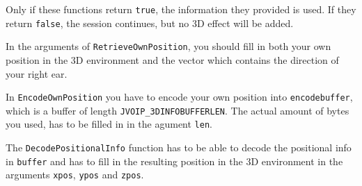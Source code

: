 		Only if these functions return {\tt true}, the information they provided
		is used. If they return {\tt false}, the session continues, but 
		no 3D effect will be added.
		
		In the arguments of {\tt Retrieve\-Own\-Position}, you should fill in both
		your own position in the 3D environment and the vector which contains
		the direction of your right ear.
		
		In {\tt Encode\-Own\-Position} you have to encode your own position into
		{\tt encode\-buffer}, which is a buffer of length {\tt JVOIP\_\-3DINFO\-BUFFER\-LEN}.
		The actual amount of bytes you used, has to be filled in in the agument
		{\tt len}.
		
		The {\tt Decode\-Positional\-Info} function has to be able to decode
		the positional info in {\tt buffer} and has to fill in the resulting 
		position in the 3D environment in the arguments {\tt xpos}, {\tt ypos} 
		and {\tt zpos}.
		
